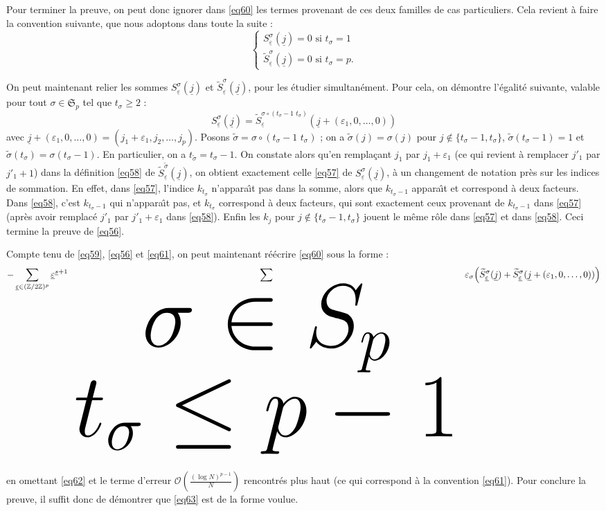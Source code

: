 \documentclass[12pt,francais, reqno]{smfart}
\numberwithin{equation}{section}
\newcommand{\Z}{\mathbb Z}
\newcommand{\gdo}{\mathcal{O}}
\newcommand{\indso}[2]{{\tiny {\begin{array}{c} #1 \\ #2 \end{array}}}}
\newcommand{\spp}{{\mathfrak S}_p}
\newcommand{\zdzp}{(\Z / 2 \Z)^p}
\newcommand{\eps}{\varepsilon}
\newcommand{\sigmati}{\widetilde \sigma}
\newcommand{\epssoul}{\underline{\eps}}
\newcommand{\jsoul}{\underline{j}}
\newcommand{\jtisoul}{\underline{j} + (\eps_1, 0, \ldots, 0)}
\newcommand{\ssoul}{\underline{s}}
\newcommand{\tsig}{t_{\sigma}}
\newcommand{\tsigti}{t_{\sigmati}}
\newcommand{\sesj}{S_{\epssoul} ^\sigma (\jsoul)}
\newcommand{\sesjti}{\widetilde{S}_{\epssoul} ^\sigma (\jsoul)}
\newcommand{\sesjtisigti}{\widetilde{S}_{\epssoul} ^{\sigmati} (\jsoul)}
\newcommand{\sesjtirondjtisoul}{\widetilde{S}_{\epssoul} ^{\sigma \circ \transpotsig} (\jtisoul)}
\newcommand{\sesjtijti}{\widetilde{S}_{\epssoul} ^\sigma (\jtisoul)}
\newcommand{\transpotsig}{ (\tsig-1 \, \, \tsig)}
\begin{document}
Pour terminer la preuve, on peut donc ignorer dans \eqref{eq60} les termes provenant de ces deux familles de cas particuliers. Cela revient \`a faire la convention suivante, que nous adoptons dans toute la suite : 
\begin{equation} \label{eq61}
\left\{
\begin{array}{l}
\sesj = 0 \mbox{ si } \tsig = 1 \\
\sesjti = 0 \mbox{ si } \tsig = p. 
\end{array}
\right.
\end{equation}

On peut maintenant relier les sommes $\sesj$ et $\sesjti$, pour les \'etudier simultan\'ement. Pour cela, on d\'emontre l'\'egalit\'e suivante, valable pour tout $\sigma \in \spp$ tel que $\tsig \geq 2$ : 
\begin{equation} \label{eq56}
\sesj = \sesjtirondjtisoul
\end{equation}
avec $\jtisoul = (j_1+\eps_1, j_2, \ldots, j_p)$. Posons $\sigmati = \sigma \circ \transpotsig$ ; 
on a $\sigmati(j) = \sigma(j)$ pour $j \not\in \{\tsig-1, \tsig\}$, $\sigmati(\tsig-1) = 1$ et $\sigmati(\tsig) = \sigma(\tsig-1)$. En particulier, on a $\tsigti = \tsig - 1$. On constate alors qu'en rempla\c cant $j_1$ par $j_1 + \eps_1$ (ce qui revient \`a remplacer $j'_1$ par $j'_1+1$) dans la d\'efinition \eqref{eq58} de $\sesjtisigti$, on obtient exactement celle \eqref{eq57} de $\sesj$,  \`a un changement de notation pr\`es sur les indices de sommation. 
 En effet, dans \eqref{eq57}, l'indice $k_{\tsig}$ n'appara\^{\i}t pas dans la somme, alors que $k_{\tsig - 1}$ appara\^{\i}t et correspond \`a deux facteurs. Dans \eqref{eq58}, c'est $k_{\tsig-1}$ qui n'appara\^{\i}t pas, et $k_{\tsig}$ correspond \`a deux facteurs, qui sont exactement ceux provenant de $k_{\tsig-1}$ dans \eqref{eq57} (apr\`es avoir remplac\'e $j'_1$ par $j'_1+\eps_1$ dans \eqref{eq58}). Enfin les $k_j$ pour $j \not\in \{\tsig-1, \tsig\}$ jouent le m\^eme r\^ole dans \eqref{eq57} et dans \eqref{eq58}. Ceci termine la preuve de \eqref{eq56}. 

\bigskip

Compte tenu de \eqref{eq59}, \eqref{eq56} et \eqref{eq61}, on peut maintenant r\'e\'ecrire \eqref{eq60} sous la forme : 
\begin{equation} \label{eq63}
-  \sum_{\epssoul \in \zdzp} \epssoul ^{\ssoul + 1}   \sum_\indso{\sigma \in \spp}{\tsig \leq  p-1} \eps_\sigma  
\Big( \sesjti + \sesjtijti \Big)
\end{equation}
en omettant \eqref{eq62} et le terme d'erreur $ \gdo(\frac{(\log N)^{p-1}}{N})$ rencontr\'es plus haut (ce qui correspond \`a la convention \eqref{eq61}). 
Pour conclure la preuve, il suffit donc de d\'emontrer que \eqref{eq63} est de la forme voulue. 
\end{document}
